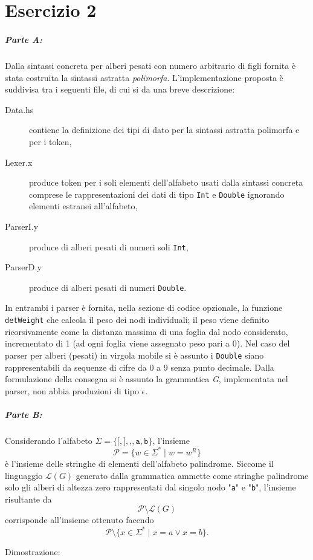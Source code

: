 \documentclass[a4paper, oneside, 11pt]{article}
\begin{document}
\section*{Esercizio 2}
\subparagraph*{Parte A:}
Dalla sintassi concreta per alberi pesati con numero arbitrario di figli fornita \`e stata costruita la sintassi astratta \textit{polimorfa}.
L'implementazione proposta \`e suddivisa tra i seguenti file, di cui si da una breve descrizione:
\begin{description}
	\item[Data.hs] contiene la definizione dei tipi di dato per la sintassi astratta polimorfa  e per i token,
	\item[Lexer.x] produce token per i soli elementi dell'alfabeto usati dalla sintassi concreta comprese le rappresentazioni dei dati di tipo \texttt{Int} e \texttt{Double} ignorando elementi estranei all'alfabeto,
	\item[ParserI.y] produce di alberi pesati di numeri soli \texttt{Int},
	\item[ParserD.y] produce di alberi pesati di numeri \texttt{Double}.
\end{description}	
\par
In entrambi i parser \`e fornita, nella sezione di codice opzionale, la funzione \texttt{detWeight} che calcola il peso dei nodi individuali; il peso viene definito ricorsivamente come la distanza massima di una foglia dal nodo considerato, incrementato di 1 (ad ogni foglia viene assegnato peso pari a 0). 
Nel caso del parser per alberi (pesati) in virgola mobile si \`e assunto i \texttt{Double} siano rappresentabili da sequenze di cifre da 0 a 9 senza punto decimale.
Dalla formulazione della consegna si \`e assunto la grammatica \textit{G}, implementata nel parser, non abbia produzioni di tipo \(\epsilon\).
\subparagraph*{Parte B:}
Considerando l'alfabeto \(\Sigma=\{\texttt{[},\texttt{]},\texttt{,},\texttt{a},\texttt{b}\}\), l'insieme \[\mathcal{P}=\{w \in \Sigma^{\ast}\mid w=w^{R}\}\] \`e l'insieme delle stringhe di elementi dell'alfabeto palindrome. 
Siccome il linguaggio \(\mathcal{L}(G)\) generato dalla grammatica ammette come stringhe palindrome solo gli alberi di altezza zero rappresentati dal singolo nodo "\texttt{a}" e "\texttt{b}", l'insieme risultante da \[\mathcal{P}\setminus\mathcal{L}(G)\] corrisponde all'insieme ottenuto facendo %
\[\mathcal{P}\setminus\{x\in\Sigma^{\ast}\mid x=a \vee x=b\}.\]
\par
Dimostrazione:
\end{document}
